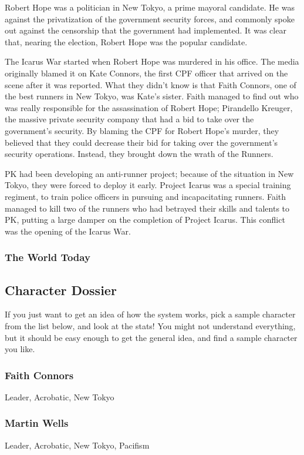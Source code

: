 \documentclass{article}
\begin{document}
\begin{multicols}{2}
Robert Hope was a politician in New Tokyo, a prime mayoral candidate. He was
against the privatization of the government security forces, and commonly spoke
out against the censorship that the government had implemented. It was clear
that, nearing the election, Robert Hope was the popular candidate.

The Icarus War started when Robert Hope was murdered in his office. The media
originally blamed it on Kate Connors, the first CPF officer that arrived on the
scene after it was reported. What they didn’t know is that Faith Connors, one
of the best runners in New Tokyo, was Kate’s sister. Faith managed to find out
who was really responsible for the assassination of Robert Hope; Pirandello
Kreuger, the massive private security company that had a bid to take over the
government’s security. By blaming the CPF for Robert Hope’s murder, they
believed that they could decrease their bid for taking over the government’s
security operations. Instead, they brought down the wrath of the Runners.

PK had been developing an anti-runner project; because of the situation in New
Tokyo, they were forced to deploy it early. Project Icarus was a special
training regiment, to train police officers in pursuing and incapacitating
runners. Faith managed to kill two of the runners who had betrayed their skills
and talents to PK, putting a large damper on the completion of Project Icarus.
This conflict was the opening of the Icarus War.
\subsubsection{The World Today}
\subsection{Character Dossier}
If you just want to get an idea of how the system works, pick a sample character
from the list below, and look at the stats! You might not understand
everything, but it should be easy enough to get the general idea, and find a
sample character you like.
\subsubsection{Faith Connors}
Leader, Acrobatic, New Tokyo
\subsubsection{Martin Wells}
Leader, Acrobatic, New Tokyo, Pacifism


\end{multicols}
\end{document}
